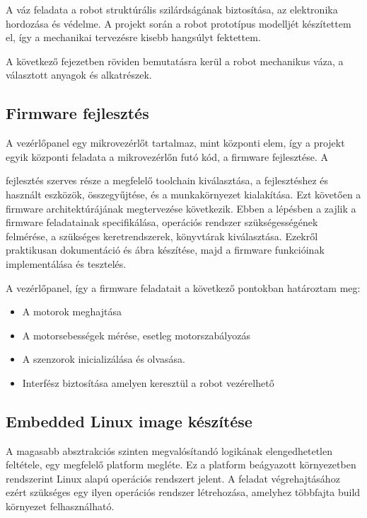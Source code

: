 A váz feladata a robot struktúrális szilárdságának biztosítása, az elektronika
hordozása és védelme. A projekt során a robot prototípus modelljét készítettem
el, így a mechanikai tervezésre kisebb hangsúlyt fektettem.

A következő fejezetben röviden bemutatásra kerül a robot mechanikus váza, a
választott anyagok és alkatrészek.

\subsection{Firmware fejlesztés}

A vezérlőpanel egy mikrovezérlőt tartalmaz, mint központi elem, így a projekt
egyik központi feladata a mikrovezérlőn futó kód, a firmware fejlesztése. A

fejlesztés szerves része a megfelelő toolchain kiválasztása, a fejlesztéshez és
használt eszközök, összegyűjtése, és a munkakörnyezet kialakítása. Ezt követően a
firmware architektúrájának megtervezése következik. Ebben a lépésben a zajlik a
firmware feladatainak specifikálása, operációs rendszer szükségességének
felmérése, a szükséges keretrendszerek, könyvtárak kiválasztása. Ezekről
praktikusan dokumentáció és ábra készítése, majd a firmware funkcióinak
implementálása és tesztelés.

A vezérlőpanel, így a firmware feladatait a következő pontokban határoztam meg:

\begin{itemize}
\item A motorok meghajtása
\item A motorsebességek mérése, esetleg motorszabályozás
\item A szenzorok inicializálása és olvasása.
\item Interfész biztosítása amelyen keresztül a robot vezérelhető
\end{itemize}

\subsection{Embedded Linux image készítése}

A magasabb absztrakciós szinten megvalósítandó logikának elengedhetetlen
feltétele, egy megfelelő platform megléte. Ez a platform beágyazott környezetben
rendszerint Linux alapú operációs rendszert jelent. A feladat végrehajtásához
ezért szükséges egy ilyen operációs rendszer létrehozása, amelyhez többfajta
build környezet felhasználható.

